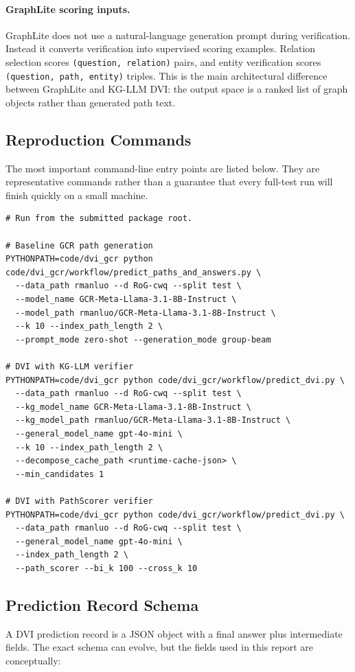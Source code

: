 \documentclass[10pt,twocolumn]{article}
\newcommand{\code}[1]{\texttt{#1}}
\begin{document}
\paragraph{GraphLite scoring inputs.}
GraphLite does not use a natural-language generation prompt during verification. Instead it converts verification into supervised scoring examples. Relation selection scores \code{(question, relation)} pairs, and entity verification scores \code{(question, path, entity)} triples. This is the main architectural difference between GraphLite and KG-LLM DVI: the output space is a ranked list of graph objects rather than generated path text.


\subsection{Reproduction Commands}
The most important command-line entry points are listed below. They are representative commands rather than a guarantee that every full-test run will finish quickly on a small machine.

\begin{verbatim}
# Run from the submitted package root.

# Baseline GCR path generation
PYTHONPATH=code/dvi_gcr python code/dvi_gcr/workflow/predict_paths_and_answers.py \
  --data_path rmanluo --d RoG-cwq --split test \
  --model_name GCR-Meta-Llama-3.1-8B-Instruct \
  --model_path rmanluo/GCR-Meta-Llama-3.1-8B-Instruct \
  --k 10 --index_path_length 2 \
  --prompt_mode zero-shot --generation_mode group-beam

# DVI with KG-LLM verifier
PYTHONPATH=code/dvi_gcr python code/dvi_gcr/workflow/predict_dvi.py \
  --data_path rmanluo --d RoG-cwq --split test \
  --kg_model_name GCR-Meta-Llama-3.1-8B-Instruct \
  --kg_model_path rmanluo/GCR-Meta-Llama-3.1-8B-Instruct \
  --general_model_name gpt-4o-mini \
  --k 10 --index_path_length 2 \
  --decompose_cache_path <runtime-cache-json> \
  --min_candidates 1

# DVI with PathScorer verifier
PYTHONPATH=code/dvi_gcr python code/dvi_gcr/workflow/predict_dvi.py \
  --data_path rmanluo --d RoG-cwq --split test \
  --general_model_name gpt-4o-mini \
  --index_path_length 2 \
  --path_scorer --bi_k 100 --cross_k 10
\end{verbatim}

\subsection{Prediction Record Schema}
A DVI prediction record is a JSON object with a final answer plus intermediate fields. The exact schema can evolve, but the fields used in this report are conceptually:
\end{document}
